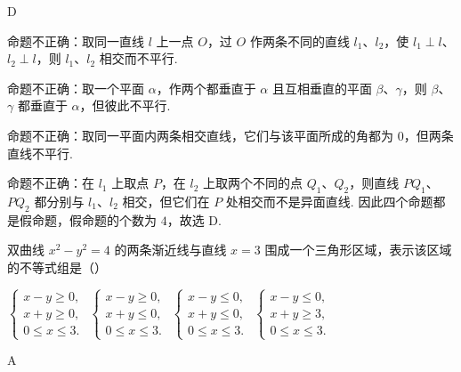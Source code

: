 \begin{answer}
D
\end{answer}

\begin{solution}
命题不正确：取同一直线 \(l\) 上一点 \(O\)，过 \(O\) 作两条不同的直线 \(l_1\)、\(l_2\)，使 \(l_1\perp l\)、\(l_2\perp l\)，则 \(l_1\)、\(l_2\) 相交而不平行.

命题不正确：取一个平面 \(\alpha\)，作两个都垂直于 \(\alpha\) 且互相垂直的平面 \(\beta\)、\(\gamma\)，则 \(\beta\)、\(\gamma\) 都垂直于 \(\alpha\)，但彼此不平行.

命题不正确：取同一平面内两条相交直线，它们与该平面所成的角都为 \(0\)，但两条直线不平行.

命题不正确：在 \(l_1\) 上取点 \(P\)，在 \(l_2\) 上取两个不同的点 \(Q_1\)、\(Q_2\)，则直线 \(PQ_1\)、\(PQ_2\) 都分别与 \(l_1\)、\(l_2\) 相交，但它们在 \(P\) 处相交而不是异面直线. 因此四个命题都是假命题，假命题的个数为 \(4\)，故选 D.
\end{solution}

\begin{problem}
双曲线 \(x^{2} - y^{2} = 4\) 的两条渐近线与直线 \(x = 3\) 围成一个三角形区域，表示该区域的不等式组是（\quad）

\choices
    {\(\begin{cases}
x - y \geqslant 0,\\
x + y \geqslant 0,\\
0 \leqslant x \leqslant 3.
\end{cases}\)}
    {\(\begin{cases}
x - y \geqslant 0,\\
x + y \leqslant 0,\\
0 \leqslant x \leqslant 3.
\end{cases}\)}
    {\(\begin{cases}
x - y \leqslant 0,\\
x + y \leqslant 0,\\
0 \leqslant x \leqslant 3.
\end{cases}\)}
    {\(\begin{cases}
x - y \leqslant 0,\\
x + y \geqslant 3,\\
0 \leqslant x \leqslant 3.
\end{cases}\)}
\end{problem}

\begin{answer}
A
\end{answer}

